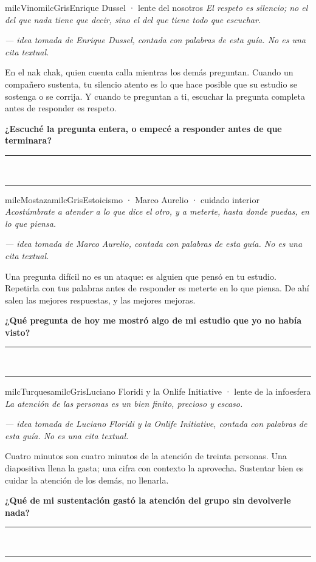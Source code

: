 \documentclass[11pt,letterpaper]{article}
\newcommand{\linead}[1]{\noindent\color{milcLinea}\rule{#1}{0.5pt}\color{milcNegro}}
\begin{document}
\begin{softbox}{milcVino}{milcGris}{Enrique Dussel · lente del nosotros}
\textit{El respeto es silencio; no el del que nada tiene que decir, sino el del que tiene todo que escuchar.}

{\footnotesize\itshape\color{milcNegro!70}--- idea tomada de Enrique Dussel, contada con palabras de esta guía. No es una cita textual.}

En el nak chak, quien cuenta calla mientras los demás preguntan. Cuando un compañero sustenta, tu silencio atento es lo que hace posible que su estudio se sostenga o se corrija. Y cuando te preguntan a ti, escuchar la pregunta completa antes de responder es respeto.

\textbf{¿Escuché la pregunta entera, o empecé a responder antes de que terminara?}
\end{softbox}
\linead{\linewidth}\\[1mm]
\linead{\linewidth}

\begin{softbox}{milcMostaza}{milcGris}{Estoicismo · Marco Aurelio · cuidado interior}
\textit{Acostúmbrate a atender a lo que dice el otro, y a meterte, hasta donde puedas, en lo que piensa.}

{\footnotesize\itshape\color{milcNegro!70}--- idea tomada de Marco Aurelio, contada con palabras de esta guía. No es una cita textual.}

Una pregunta difícil no es un ataque: es alguien que pensó en tu estudio. Repetirla con tus palabras antes de responder es meterte en lo que piensa. De ahí salen las mejores respuestas, y las mejores mejoras.

\textbf{¿Qué pregunta de hoy me mostró algo de mi estudio que yo no había visto?}
\end{softbox}
\linead{\linewidth}\\[1mm]
\linead{\linewidth}

\begin{softbox}{milcTurquesa}{milcGris}{Luciano Floridi y la Onlife Initiative · lente de la infoesfera}
\textit{La atención de las personas es un bien finito, precioso y escaso.}

{\footnotesize\itshape\color{milcNegro!70}--- idea tomada de Luciano Floridi y la Onlife Initiative, contada con palabras de esta guía. No es una cita textual.}

Cuatro minutos son cuatro minutos de la atención de treinta personas. Una diapositiva llena la gasta; una cifra con contexto la aprovecha. Sustentar bien es cuidar la atención de los demás, no llenarla.

\textbf{¿Qué de mi sustentación gastó la atención del grupo sin devolverle nada?}
\end{softbox}
\linead{\linewidth}\\[1mm]
\linead{\linewidth}
\end{document}
